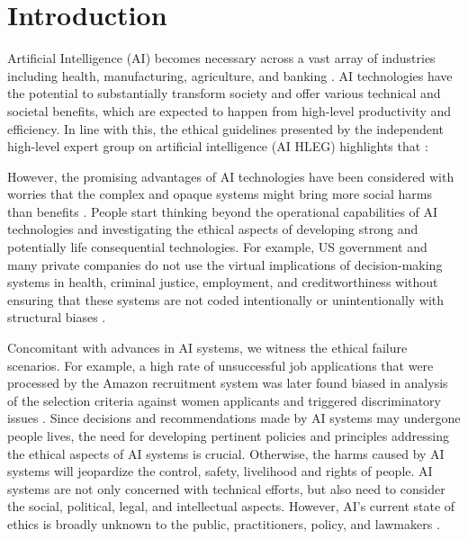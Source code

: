 \section{Introduction}
\label{Introduction}
Artificial Intelligence (AI) becomes necessary across a vast array of industries including health, manufacturing, agriculture, and banking \cite{AR1}. AI technologies have the potential to substantially transform society and offer various technical and societal benefits, which are expected to happen from high-level productivity and efficiency. In line with this, the ethical guidelines presented by the
independent high-level expert group on artificial intelligence (AI HLEG) highlights that \cite{AR2}:


However, the promising advantages of AI technologies have been considered with worries that the complex and opaque systems might bring more social harms than benefits \cite{AR1}. People start thinking beyond the operational capabilities of AI technologies and investigating the ethical aspects of developing strong and potentially life consequential technologies. For example, US government and many private companies do not use the virtual implications of decision-making systems in health, criminal justice, employment, and creditworthiness without ensuring that these systems are not coded intentionally or unintentionally with structural biases \cite{AR1}.

Concomitant with advances in AI systems, we witness the ethical failure scenarios. For example, a high rate of unsuccessful job applications that were processed by the Amazon recruitment system was later found biased in analysis of the selection criteria against women applicants and triggered discriminatory issues \cite{AR3}. Since decisions and recommendations made by AI systems may undergone people lives, the need for developing pertinent policies and principles addressing the ethical aspects of AI systems is crucial. Otherwise, the harms caused by AI systems will jeopardize the control, safety, livelihood and rights of people. AI systems are not only concerned with technical efforts, but also need to consider the social, political, legal, and intellectual aspects. However, AI's current state of ethics is broadly unknown to the public, practitioners, policy, and lawmakers \cite{AR4}\cite{vallor2017artificial}.

